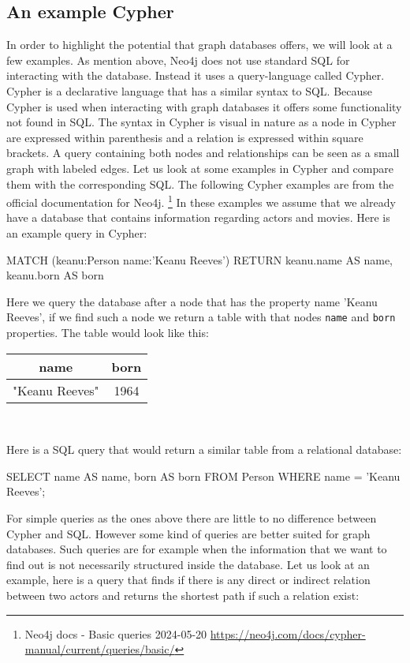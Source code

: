 \subsection{An example Cypher}
In order to highlight the potential that graph databases offers, we will look at a few examples. 
As mention above, Neo4j does not use standard SQL for interacting with the database. Instead it uses a query-language called Cypher. Cypher is a declarative language that has a similar syntax to SQL. Because Cypher is used when interacting with graph databases it offers some functionality not found in SQL. The syntax in Cypher is visual in nature as a node in Cypher are expressed within parenthesis and a relation is expressed within square brackets. A query containing both nodes and relationships can be seen as a small graph with labeled edges. Let us look at some examples in Cypher and compare them with the corresponding SQL. The following Cypher examples are from the official documentation for Neo4j. \footnote{Neo4j docs - Basic queries 2024-05-20 \url{https://neo4j.com/docs/cypher-manual/current/queries/basic/}} In these examples we assume that we already have a database that contains information regarding actors and movies. Here is an example query in Cypher:
\begin{sqlCode}
  MATCH (keanu:Person {name:'Keanu Reeves'})
  RETURN keanu.name AS name, keanu.born AS born
\end{sqlCode}
Here we query the database after a node that has the property name 'Keanu Reeves', if we find such a node we return a table with that nodes \texttt{name} and \texttt{born} properties. The table would look like this:
\begin{center}
  \begin{tabular}{|c|c|}
    \hline
    name           & born \\
    \hline
    "Keanu Reeves" & 1964 \\
    \hline
  \end{tabular}\\
\end{center}
Here is a SQL query that would return a similar table from a relational database:


\begin{sqlCode}
SELECT
  name AS name,
  born AS born
FROM
  Person
WHERE
  name = 'Keanu Reeves';
\end{sqlCode}

For simple queries as the ones above there are little to no difference between Cypher and SQL. However some kind of queries are better suited for graph databases. Such queries are for example when the information that we want to find out is not necessarily structured inside the database. Let us look at an example, here is a query that finds if there is any direct or indirect relation between two actors and returns the shortest path if such a relation exist:

